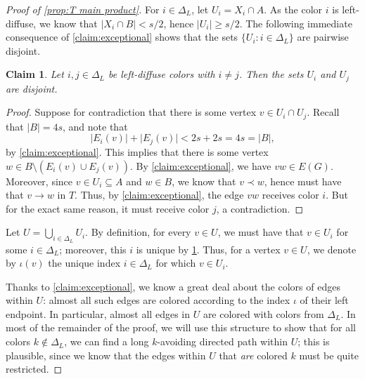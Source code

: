 \documentclass[10pt,a4paper]{amsart}
\newtheorem{claim}{Claim}
\newcommand\ab[1]{\lvert#1\rvert}
\begin{document}
\begin{proof}[Proof of \cref{prop:T main product}]
    For $i \in \Delta_L$, let $U_i = X_i \cap A$. As the color $i$ is left-diffuse, we know that $\ab{X_i \cap B}<s/2$, hence $\ab{U_i}\geq s/2$. 
    The following immediate consequence of \cref{claim:exceptional} shows that the sets $\{U_i : i \in \Delta_L\}$ are pairwise disjoint.
    \begin{claim}\label{claim:T Ui disjoint}
        Let $i,j \in \Delta_L$ be left-diffuse colors with $i \neq j$. Then the sets $U_i$ and $U_j$ are disjoint.
    \end{claim}
    \begin{proof}
        Suppose for contradiction that there is some vertex $v \in U_i \cap U_j$. Recall that $\ab B=4s$, and note that
        \[
            \ab{E_i(v)} + \ab{E_j(v)} < 2s+2s = 4s = \ab B,
        \]
        by \cref{claim:exceptional}.
        This implies that there is some vertex $w \in B \setminus (E_i(v) \cup E_j(v))$. By \cref{claim:exceptional}, we have $vw \in E(G)$. Moreover, since $v \in U_i \subseteq A$ and $w \in B$, we know that $v \prec w$, hence must have that $v\to w$ in $T$. Thus, by \cref{claim:exceptional}, the edge $vw$ receives color $i$. 
        But for the exact same reason, it must receive color $j$, a contradiction.
    \end{proof}
    Let $U = \bigcup_{i \in \Delta_L}U_i$. 
    By definition, for every $v \in U$, we must have that $v \in U_i$ for some $i\in \Delta_L$; moreover, this $i$ is unique by \cref{claim:T Ui disjoint}. Thus, for a vertex $v \in U$, we denote by $\iota(v)$ the unique index $i\in \Delta_L$ for which $v \in U_{i}$.
    
    Thanks to \cref{claim:exceptional}, we know a great deal about the colors of edges within $U$: almost all such edges are colored according to the index $\iota$ of their left endpoint. In particular, almost all edges in $U$ are colored with colors from $\Delta_L$. 
    In most of the remainder of the proof, we will use this structure to show that for all colors $k \notin \Delta_L$, we can find a long $k$-avoiding directed path within $U$; this is plausible, since we know that the edges within $U$ that \emph{are} colored $k$ must be quite restricted.


\end{proof}
\end{document}

